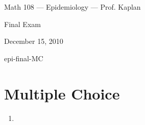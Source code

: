 \documentclass{article}
\newcommand{\MCinput}[1]{}
\newcommand{\oneOfThese}[2]{#1#2}
\newcommand{\examVersion}{A}\newcommand{\scramble}[4]{#1#2#3#4}
\renewcommand{\oneOfThese}[2]{#2}
\begin{document}
\noindent{\tiny \examVersion}

\centerline{\large Math 108 --- Epidemiology --- Prof. Kaplan}
\medskip
\centerline{\large \sf Final Exam}
%
\bigskip
\centerline{\large \sf December 15, 2010}



\startAcroScore


\begin{AcroScoreProblem}{epi-final-MC}


\section*{Multiple Choice}

\begin{enumerate}


\newpage

\oneOfThese{\item   \MCinput{124}}{\item   \MCinput{125}}


\end{enumerate}
\end{AcroScoreProblem}
\end{document}
